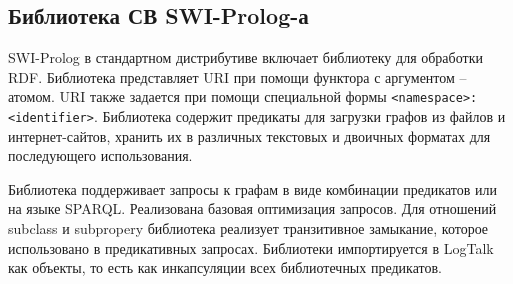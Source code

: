 \documentclass[conference]{IEEEtran} \IEEEoverridecommandlockouts
\begin{document}
\subsection{Библиотека СВ SWI-Prolog-а} \label{sec:swi-sw}

SWI-Prolog в стандартном дистрибутиве включает библиотеку для обработки RDF. Библиотека представляет URI при помощи функтора с аргументом -- атомом. URI также задается при помощи специальной формы \texttt{<namespace>:<identifier>}. Библиотека содержит предикаты для загрузки графов из файлов и интернет-сайтов, хранить их в различных текстовых и двоичных форматах для последующего использования.

Библиотека поддерживает запросы к графам в виде комбинации предикатов или на языке SPARQL. Реализована базовая оптимизация запросов. Для отношений subclass и subpropery библиотека реализует транзитивное замыкание, которое использовано в предикативных запросах. Библиотеки импортируется в LogTalk как объекты, то есть как инкапсуляции всех библиотечных предикатов.
\end{document}
